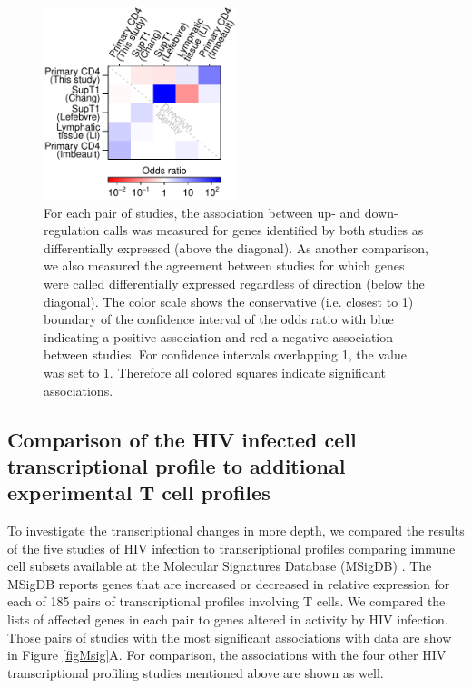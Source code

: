 \documentclass[../sherrill-Mix_thesis.tex]{subfiles}
\begin{document}
		\begin{figure}
			\centering
				\includegraphics[width=0.5\textwidth]{compare.pdf}
			\caption[Comparisons among studies quantifying cellular gene expression after HIV infection.]{For each pair of studies, the association between up- and down-regulation calls was measured for genes identified by both studies as differentially expressed (above the diagonal).  As another comparison, we also measured the agreement between studies for which genes were called differentially expressed regardless of direction (below the diagonal). The color scale shows the conservative (i.e. closest to 1) boundary of the confidence interval of the odds ratio with blue indicating a positive association and red a negative association between studies. For confidence intervals overlapping 1, the value was set to 1. Therefore all colored squares indicate significant associations.}
			\label{figGenes}
		\end{figure}

	\subsection{Comparison of the HIV infected cell transcriptional profile to additional experimental T cell profiles}
		To investigate the transcriptional changes in more depth, we compared the results of the five studies of HIV infection to transcriptional profiles comparing immune cell subsets available at the Molecular Signatures Database (MSigDB) \citep{Subramanian2005}. The MSigDB reports genes that are increased or decreased in relative expression for each of 185 pairs of transcriptional profiles involving \cdFour{} T cells.  We compared the lists of affected genes in each pair to genes altered in activity by HIV infection. Those pairs of studies with the most significant associations with \hivEight{} data are show in Figure \ref{figMsig}A.  For comparison, the associations with the four other HIV transcriptional profiling studies mentioned above are shown as well.
\end{document}

